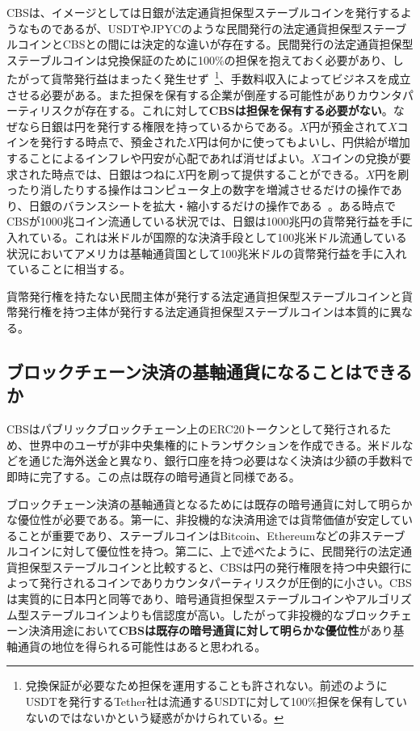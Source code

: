 \documentclass[dvipdfmx,a4paper]{jsarticle}
\begin{document}
CBSは、イメージとしては日銀が法定通貨担保型ステーブルコインを発行するようなものであるが、USDTやJPYCのような民間発行の法定通貨担保型ステーブルコインとCBSとの間には決定的な違いが存在する。民間発行の法定通貨担保型ステーブルコインは兌換保証のために100\%の担保を抱えておく必要があり、したがって貨幣発行益はまったく発生せず~\footnote{兌換保証が必要なため担保を運用することも許されない。前述のようにUSDTを発行するTether社は流通するUSDTに対して100\%担保を保有していないのではないかという疑惑がかけられている。}、手数料収入によってビジネスを成立させる必要がある。また担保を保有する企業が倒産する可能性がありカウンタパーティリスクが存在する。これに対して\textbf{CBSは担保を保有する必要がない}。なぜなら日銀は円を発行する権限を持っているからである。$X$円が預金されて$X$コインを発行する時点で、預金された$X$円は何かに使ってもよいし、円供給が増加することによるインフレや円安が心配であれば消せばよい。$X$コインの兌換が要求された時点では、日銀はつねに$X$円を刷って提供することができる。$X$円を刷ったり消したりする操作はコンピュータ上の数字を増減させるだけの操作であり、日銀のバランスシートを拡大・縮小するだけの操作である~\cite{mmt2016wray}。ある時点でCBSが1000兆コイン流通している状況では、日銀は1000兆円の貨幣発行益を手に入れている。これは米ドルが国際的な決済手段として100兆米ドル流通している状況においてアメリカは基軸通貨国として100兆米ドルの貨幣発行益を手に入れていることに相当する。

貨幣発行権を持たない民間主体が発行する法定通貨担保型ステーブルコインと貨幣発行権を持つ主体が発行する法定通貨担保型ステーブルコインは本質的に異なる。

\subsection{ブロックチェーン決済の基軸通貨になることはできるか}

CBSはパブリックブロックチェーン上のERC20トークンとして発行されるため、世界中のユーザが非中央集権的にトランザクションを作成できる。米ドルなどを通じた海外送金と異なり、銀行口座を持つ必要はなく決済は少額の手数料で即時に完了する。この点は既存の暗号通貨と同様である。

ブロックチェーン決済の基軸通貨となるためには既存の暗号通貨に対して明らかな優位性が必要である。第一に、非投機的な決済用途では貨幣価値が安定していることが重要であり、ステーブルコインはBitcoin、Ethereumなどの非ステーブルコインに対して優位性を持つ。第二に、上で述べたように、民間発行の法定通貨担保型ステーブルコインと比較すると、CBSは円の発行権限を持つ中央銀行によって発行されるコインでありカウンタパーティリスクが圧倒的に小さい。CBSは実質的に日本円と同等であり、暗号通貨担保型ステーブルコインやアルゴリズム型ステーブルコインよりも信認度が高い。したがって非投機的なブロックチェーン決済用途において\textbf{CBSは既存の暗号通貨に対して明らかな優位性}があり基軸通貨の地位を得られる可能性はあると思われる。
\end{document}
